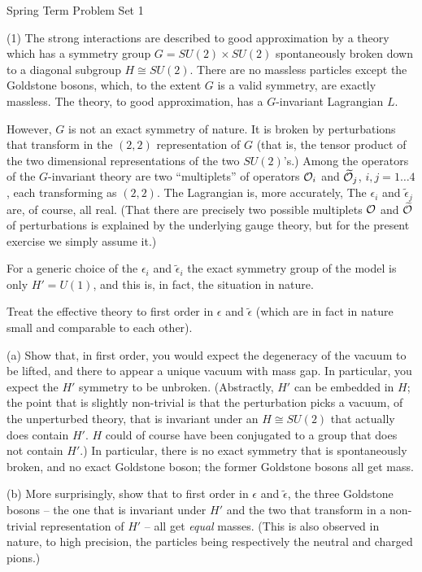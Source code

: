 

Spring Term
Problem Set 1

(1) The strong interactions are described to good approximation
by a theory which has a symmetry group $G=SU(2)\times SU(2)$
spontaneously broken down to a diagonal subgroup $H\cong SU(2)$.
There are no massless particles except the Goldstone bosons, which,
to the extent $G$ is a valid symmetry, are exactly massless.
The theory, to good approximation, has a $G$-invariant Lagrangian $L$.

\def\O{{{\cal O}}}
\def\tilde{\widetilde}
However, $G$ is not an exact symmetry of nature.  It is broken
by perturbations that transform in the $(2,2)$ representation of $G$
(that is, the tensor product of the two dimensional  representations
 of the two $SU(2)$'s.)
Among the operators of the $G$-invariant theory are two ``multiplets''
of operators $\O_i$ and $\tilde \O_j$, $i,j=1\dots 4$, each
transforming as $(2,2)$.  The Lagrangian is, more accurately,
\eqn\duffo{\tilde L= L+\sum_{i=1}^4\left(\epsilon_i\O_i+\tilde \epsilon_i
\tilde O_i\right).}
The $\epsilon_i$ and $\tilde \epsilon_j$ are, of course, all real.
(That there are precisely two possible multiplets $\O$ and $\tilde \O$ of
perturbations is explained by the underlying gauge theory, but for the
present exercise we simply assume it.)

For a generic choice of the $\epsilon_i$ and $\tilde \epsilon_i$
the exact symmetry group of the model is only $H'=U(1)$, and this is,
in fact, the situation in nature.  

Treat the effective theory to first order in $\epsilon$ and $\tilde\epsilon$
(which are in fact in nature small and comparable to each other).

(a) Show that, in first order, you would expect the degeneracy of the
vacuum to be lifted, and there to appear a unique vacuum with mass gap.
In particular, you expect the $H'$ symmetry to be unbroken.
(Abstractly, $H'$ can be embedded in $H$; the point that is slightly
non-trivial is that the perturbation picks       a vacuum, of the
unperturbed theory, that is invariant under an $H\cong SU(2)$ that actually
does contain $H'$.  $H$ could of course have been conjugated to a group
that does not contain $H'$.) In particular, there is no exact symmetry
that is spontaneously broken, and no exact Goldstone boson; the former
Goldstone bosons all get mass.

(b) More surprisingly, show that to first order in $\epsilon$ and $\tilde
\epsilon$, the three Goldstone bosons -- the one that is invariant
under $H'$ and the two that transform in a non-trivial representation
of $H'$ -- all get {\it equal} masses.  (This is also observed in nature,
to high precision, the particles being respectively the neutral and
charged pions.)

